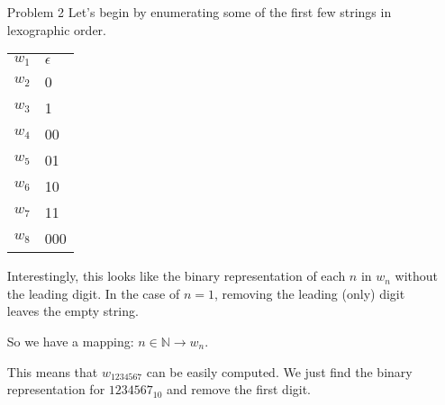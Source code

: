 \documentclass[12pt,letterpaper]{article}
\begin{document}
\begin{enumerate}
\begin{proof}
        Inductive Hypothesis:
        \[D_n = 9 \cdot 10^{\lfloor \frac{n-1}{2} \rfloor}\]

        Inductive Case:
        \begin{align*}
          D_{n+1} &= D_{n-1} \cdot 10 \\
          &= 9 \cdot 10^{\lfloor \frac{(n-1)-1}{2} \rfloor} \cdot 10 \\
          &= 9 \cdot 10^{\lfloor \frac{n-2}{2} \rfloor} \cdot 10 \\
          &= 9 \cdot 10^{\lfloor \frac{n}{2}-\frac{2}{2} \rfloor} \cdot 10 \\
          &= 9 \cdot 10^{\lfloor \frac{n}{2}-1 \rfloor} \cdot 10 \\
          &= 9 \cdot 10^{\lfloor \frac{n}{2}-1+1 \rfloor} \\
          &= 9 \cdot 10^{\lfloor \frac{n}{2} \rfloor} \\
        \end{align*}

        Thus, we have proved that our formula is correct.

      \end{proof}

      Now, we can calculate
      $D_{20} = 9 \cdot 10^{\lfloor \frac{20-1}{2} \rfloor} = 9 \cdot 10^9 = 9000000000$

    \item[Problem 2]
      Let's begin by enumerating some of the first few strings in lexographic order.

      \begin{tabular}{l | l}
        \hline
        $w_1$ & $\epsilon$ \\
        $w_2$ & 0 \\
        $w_3$ & 1 \\
        $w_4$ & 00 \\
        $w_5$ & 01 \\
        $w_6$ & 10 \\
        $w_7$ & 11 \\
        $w_8$ & 000
      \end{tabular}

      Interestingly, this looks like the binary representation of each $n$ in $w_n$ without the leading digit.
      In the case of $n = 1$, removing the leading (only) digit leaves the empty string.

      So we have a mapping: $n \in \mathbb{N} \rightarrow w_n$.

      This means that $w_{1234567}$ can be easily computed.
      We just find the binary representation for $1234567_{10}$ and remove the first digit.


\end{enumerate}
\end{document}
